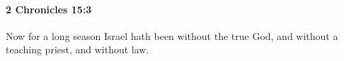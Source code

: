 
		\paragraph{2 Chronicles 15:3} %
			\label{2CHRONICLES-15-3}

			Now for a long season Israel hath been without the true God, and without a teaching priest, and without law.


